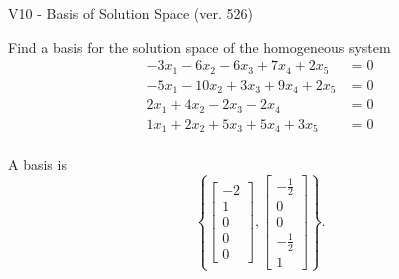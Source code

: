 \begin{exercise}
  \begin{exerciseTitle}V10 - Basis of Solution Space (ver. 526)\end{exerciseTitle}
  \begin{exerciseStatement}
    Find a basis for the solution space of the homogeneous system 
\begin{align*}
 -3 x_ 1 -6 x_ 2 -6 x_ 3 + 7 x_ 4 + 2 x_ 5 &= 0  \\ 
  -5 x_ 1 -10 x_ 2 + 3 x_ 3 + 9 x_ 4 + 2 x_ 5 &= 0  \\ 
  2 x_ 1 + 4 x_ 2 -2 x_ 3 -2 x_ 4 &= 0  \\ 
  1 x_ 1 + 2 x_ 2 + 5 x_ 3 + 5 x_ 4 + 3 x_ 5 &= 0  \\ 
 \end{align*}


 
  \end{exerciseStatement}

  \begin{exerciseAnswer}
   A basis is   
\[\left\{\left[\begin{array}{c}
-2 \\
1 \\
0 \\
0 \\
0
\end{array}\right] , \left[\begin{array}{c}
-\frac{1}{2} \\
0 \\
0 \\
-\frac{1}{2} \\
1
\end{array}\right]\right\}.\]

  


  \end{exerciseAnswer}
\end{exercise}